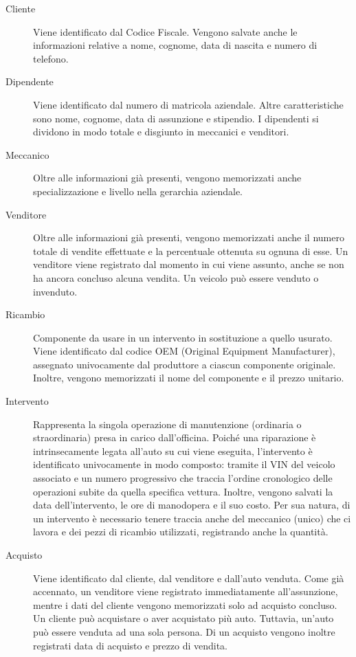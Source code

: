 \begin{description}
    \item[Cliente] Viene identificato dal Codice Fiscale. Vengono salvate anche
    le informazioni relative a nome, cognome, data di nascita e numero di telefono.

    \item[Dipendente] Viene identificato dal numero di matricola aziendale. Altre
    caratteristiche sono nome, cognome, data di assunzione e stipendio.
    I dipendenti si dividono in modo totale e disgiunto in meccanici e venditori.

    \item[Meccanico] Oltre alle informazioni già presenti, vengono memorizzati anche
    specializzazione e livello nella gerarchia aziendale.
    
    \item[Venditore] Oltre alle informazioni già presenti, vengono memorizzati anche
    il numero totale di vendite effettuate e la percentuale ottenuta su ognuna di esse.
    Un venditore viene registrato dal momento in cui viene assunto, anche se non ha
    ancora concluso alcuna vendita. Un veicolo può essere venduto o invenduto.

    \item[Ricambio] Componente da usare in un intervento in sostituzione a quello
    usurato. Viene identificato dal codice OEM (Original Equipment Manufacturer),
    assegnato univocamente dal produttore a ciascun componente originale.
    Inoltre, vengono memorizzati il nome del componente e il prezzo unitario.

    \item[Intervento] Rappresenta la singola operazione di manutenzione 
    (ordinaria o straordinaria) presa in carico dall'officina. Poiché una riparazione 
    è intrinsecamente legata all'auto su cui viene eseguita, l'intervento è 
    identificato univocamente in modo composto: tramite il VIN del veicolo associato 
    e un numero progressivo che traccia l'ordine cronologico delle operazioni
    subite da quella specifica vettura.
    Inoltre, vengono salvati la data dell'intervento, le ore di manodopera e il
    suo costo.
    Per sua natura, di un intervento è necessario tenere traccia anche del meccanico
    (unico) che ci lavora e dei pezzi di ricambio utilizzati, registrando anche la
    quantità.

    \item[Acquisto] Viene identificato dal cliente, dal venditore e dall'auto venduta.
    Come già accennato, un venditore viene registrato immediatamente all'assunzione,
    mentre i dati del cliente vengono memorizzati solo ad acquisto concluso.
    Un cliente può acquistare o aver acquistato più auto. Tuttavia, un'auto può essere
    venduta ad una sola persona. Di un acquisto vengono inoltre registrati data di
    acquisto e prezzo di vendita.
    
\end{description}